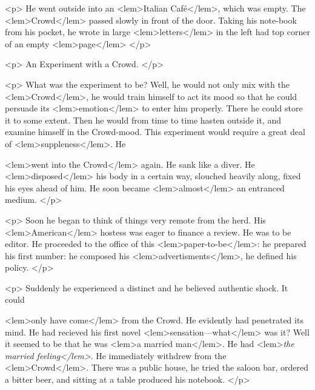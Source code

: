 {{				<p>
					He went outside into an 
<lem>Italian Caf\'e</lem>{}, 
					which was empty. The 
<lem>Crowd</lem>{} passed slowly in front 
					of the door. Taking his note-book from his pocket, he wrote in large 
<lem>letters</lem>
						{} 
					in the 
					left had top corner of an empty 
<lem>page</lem>{} 
				</p>

				<p>
					\vspace{10pt}
					\large{An Experiment with a Crowd.} 
				</p> 

				<p>
					\vspace{10pt}
					What was the experiment to be? Well, he would not only mix with the 
<lem>Crowd</lem>{}, he would 
					train himself to act its mood so that he could persuade its 
<lem>emotion</lem>
						{} 
					to enter him 
					properly. There he could store it to some extent. Then he would from time to time 
hasten outside it, and examine himself in the Crowd-mood. This experiment would 
					require a great deal of 
<lem>suppleness</lem>{}. He 
 					
<lem>went into the Crowd</lem>
						{} 
					again. He sank 
					like a diver. He 
<lem>disposed</lem>{} his body in a certain way, slouched heavily along, fixed his 
					eyes ahead of him. He soon became 
<lem>almost</lem>
						{} 
					an entranced medium. 
 				</p> 

				<p>
				Soon he began to think of things very remote from the herd. His 
<lem>American</lem>{} hostess 
				was eager to finance a review. He was to be editor. He proceeded to the office of 
				this 
<lem>paper-to-be</lem>{}: 
				he prepared his first number: he composed his 
<lem>advertisments</lem>{}, he 
				defined his policy. 
 				</p> 

				<p>
				Suddenly he experienced a distinct and he believed authentic shock. It could  
				 
<lem>only have come</lem>
					{} 
				from the Crowd. He evidently had penetrated its mind. He had recieved his 
				first novel 
<lem>sensation---what</lem>
					{} 
				was it? Well it seemed to be that he was 
<lem>a married man</lem>{}. 
				He had 
<lem>\emph{the married feeling</lem>}{}. 
				He immediately withdrew from the 
<lem>Crowd</lem>{}. There was a public 
				house, he tried the saloon bar, ordered a bitter beer, and sitting at a table 
				produced his notebook. 
				</p> 

}}
